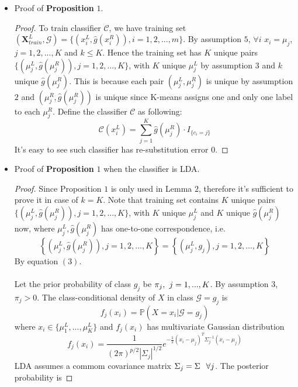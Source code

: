 \documentclass[11pt]{article}
\begin{document}
\begin{itemize}
	\item Proof of \textbf{Proposition} $1$.
	\begin{proof}
	To train classifier $\mathcal{C}$, we have training set $\left(\mathbf{X}^L_{train},\mathcal{G} \right) = \{\left(x^L_i,\hat{g} \left(x^R_i\right)\right), i =1,2,...,m\}$. By assumption $5$, $\forall i$ $x_i = \mu_j$, $j=1,2,...,K$ and $k \leq K$. Hence the training set has $K$ unique pairs $\{\left(\mu^L_j, \hat{g} \left(\mu^R_j\right)\right),j=1,2,...,K\}$, with $K$ unique $\mu^L_j$ by assumption $3$ and $k$ unique $\hat{g} \left(\mu^R_j\right)$. This is because each pair $(\mu^L_j,\mu^R_j)$ is unique by assumption $2$ and $\left(\mu^R_j,\hat{g} \left(\mu^R_j\right)\right)$ is unique since K-means assigns one and only one label to each $\mu^R_j$. Define the classifier $\mathcal{C}$ as following: \[ \mathcal{C}(x^L_i) = \sum^K_{j=1}\hat{g} \left(\mu^R_j\right) \cdot I_{\{c_i = j\}}  \] It's easy to see such classifier has re-substitution error $0$. 
	\end{proof}
	\item Proof of \textbf{Proposition} $1$ when the classifier is LDA.
	\begin{proof}
	Since Proposition $1$ is only used in Lemma $2$, therefore it's sufficient to prove it in case of $k = K$. Note that training set contains $K$ unique pairs $\{\left(\mu^L_j, \hat{g} \left(\mu^R_j\right)\right), j=1,2,...,K\}$, with $K$ unique $\mu^L_j$ and $K$ unique $\hat{g} \left(\mu^R_j\right)$ now, where $\mu^L_j, \hat{g} \left(\mu^R_j\right)$ has one-to-one correspondence, i.e.
\[ \left\lbrace\left(\mu^L_j,\hat{g} \left(\mu^R_j\right) \right), j=1,2,...,K\right\rbrace =  \left\lbrace\left(\mu^L_j, g_j \right), j=1,2,...,K\right\rbrace \]
By equation $(3)$.\\\\
Let the prior probability of class $g_j$ be $\pi_j, \hspace{0.05in} j=1,...,K$. By assumption $3$, $\pi_j > 0$. The class-conditional density of $X$ in class $\mathcal{G} = g_j$ is $$f_j\left(x_i\right) = \mathbb{P}\left( X=x_i | \mathcal{G} = g_j \right) $$ where $x_i \in \{\mu^L_1,...,\mu^L_K\}$ and $f_j\left(x_i\right)$ has multivariate Gaussian distribution
\[ f_j\left(x_i\right) = \frac{1}{(2\pi)^{p/2}|\Sigma_j|^{1/2}}e^{-\frac{1}{2}(x_i-\mu_j)^T\Sigma^{-1}_j(x_i-\mu_j)	}\]
LDA assumes a commom covariance matrix $\Sigma_j = \Sigma \hspace{0.1in} \forall j$.
The posterior probability is 

\end{proof}
\end{itemize}
\end{document}
